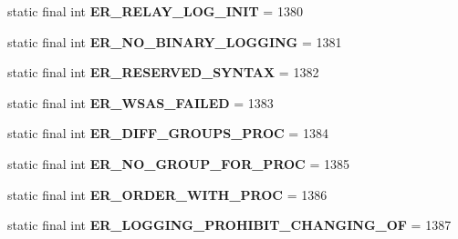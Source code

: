 \begin{DoxyCompactItemize}
static final int {\bfseries E\+R\+\_\+\+R\+E\+L\+A\+Y\+\_\+\+L\+O\+G\+\_\+\+I\+N\+IT} = 1380
\item 
\mbox{\label{classcom_1_1mysql_1_1jdbc_1_1_mysql_error_numbers_a6737b59085fd328262886de4ee8a5bc2}} 
static final int {\bfseries E\+R\+\_\+\+N\+O\+\_\+\+B\+I\+N\+A\+R\+Y\+\_\+\+L\+O\+G\+G\+I\+NG} = 1381
\item 
\mbox{\label{classcom_1_1mysql_1_1jdbc_1_1_mysql_error_numbers_a6ed100c2d42b3443d6b0f703e1690cad}} 
static final int {\bfseries E\+R\+\_\+\+R\+E\+S\+E\+R\+V\+E\+D\+\_\+\+S\+Y\+N\+T\+AX} = 1382
\item 
\mbox{\label{classcom_1_1mysql_1_1jdbc_1_1_mysql_error_numbers_a24f330d37b1c53ce542c020c97c2f97e}} 
static final int {\bfseries E\+R\+\_\+\+W\+S\+A\+S\+\_\+\+F\+A\+I\+L\+ED} = 1383
\item 
\mbox{\label{classcom_1_1mysql_1_1jdbc_1_1_mysql_error_numbers_a0e81c4205a8c4b5a7a395e6a43b742cb}} 
static final int {\bfseries E\+R\+\_\+\+D\+I\+F\+F\+\_\+\+G\+R\+O\+U\+P\+S\+\_\+\+P\+R\+OC} = 1384
\item 
\mbox{\label{classcom_1_1mysql_1_1jdbc_1_1_mysql_error_numbers_a0259ad2244fdd22548cba7bf8c92351e}} 
static final int {\bfseries E\+R\+\_\+\+N\+O\+\_\+\+G\+R\+O\+U\+P\+\_\+\+F\+O\+R\+\_\+\+P\+R\+OC} = 1385
\item 
\mbox{\label{classcom_1_1mysql_1_1jdbc_1_1_mysql_error_numbers_a16a4fe7a21f304e02e7b5e932b6dfa43}} 
static final int {\bfseries E\+R\+\_\+\+O\+R\+D\+E\+R\+\_\+\+W\+I\+T\+H\+\_\+\+P\+R\+OC} = 1386
\item 
\mbox{\label{classcom_1_1mysql_1_1jdbc_1_1_mysql_error_numbers_aad1bf16753c9789f886d6b851e1028d0}} 
static final int {\bfseries E\+R\+\_\+\+L\+O\+G\+G\+I\+N\+G\+\_\+\+P\+R\+O\+H\+I\+B\+I\+T\+\_\+\+C\+H\+A\+N\+G\+I\+N\+G\+\_\+\+OF} = 1387
\item 
\mbox{\label{classcom_1_1mysql_1_1jdbc_1_1_mysql_error_numbers_a17a57ea7f6b35f6fb341eb733a13327b}} 

\end{DoxyCompactItemize}
